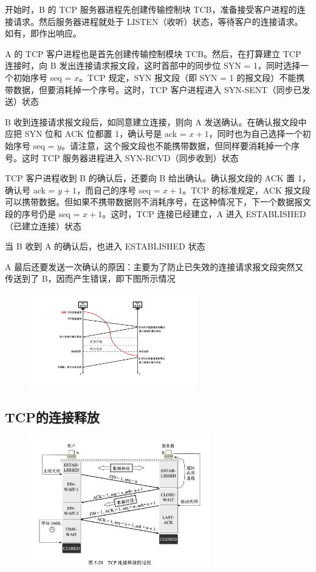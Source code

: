 \documentclass[cs4size,a4paper,10pt]{ctexart}
\begin{document}
	开始时，B 的 TCP 服务器进程先创建传输控制块 TCB，准备接受客户进程的连接请求。然后服务器进程就处于 LISTEN（收听）状态，等待客户的连接请求。如有，即作出响应。

	A 的 TCP 客户进程也是首先创建传输控制模块 TCB。然后，在打算建立 TCP 连接时，向 B 发出连接请求报文段，这时首部中的同步位 SYN = 1，同时选择一个初始序号 seq = $x$。TCP 规定，SYN 报文段（即 SYN = 1 的报文段）不能携带数据，但要消耗掉一个序号。这时，TCP 客户进程进入 SYN-SENT（同步已发送）状态

	B 收到连接请求报文段后，如同意建立连接，则向 A 发送确认。在确认报文段中应把 SYN 位和 ACK 位都置 1，确认号是 ack = $x + 1$，同时也为自己选择一个初始序号 seq = $y$。请注意，这个报文段也不能携带数据，但同样要消耗掉一个序号。这时 TCP 服务器进程进入 SYN-RCVD（同步收到）状态

	TCP 客户进程收到 B 的确认后，还要向 B 给出确认。确认报文段的 ACK 置 1，确认号 ack = $y + 1$，而自己的序号 seq = $x + 1$。TCP 的标准规定，ACK 报文段可以携带数据。但如果不携带数据则不消耗序号，在这种情况下，下一个数据报文段的序号仍是 seq = $x + 1$。这时，TCP 连接已经建立，A 进入 ESTABLISHED（已建立连接）状态

	当 B 收到 A 的确认后，也进入 ESTABLISHED 状态

	A 最后还要发送一次确认的原因：主要为了防止已失效的连接请求报文段突然又传送到了 B，因而产生错误，即下图所示情况

	\begin{figure}[H]
		\centering
		\includegraphics[width=0.65\textwidth]{img/5.8.1}
	\end{figure}

	\subsection{TCP的连接释放}

	\begin{figure}[H]
		\centering
		\includegraphics[width=0.7\textwidth]{img/5.29}
	\end{figure}
\end{document}
